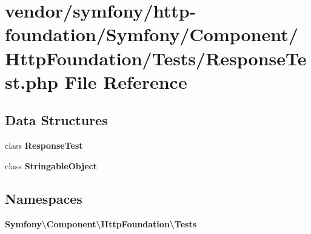 \section{vendor/symfony/http-\/foundation/\+Symfony/\+Component/\+Http\+Foundation/\+Tests/\+Response\+Test.php File Reference}
\label{_response_test_8php}
\subsection*{Data Structures}
\begin{DoxyCompactItemize}
\item 
class {\bf Response\+Test}
\item 
class {\bf Stringable\+Object}
\end{DoxyCompactItemize}
\subsection*{Namespaces}
\begin{DoxyCompactItemize}
\item 
 {\bf Symfony\textbackslash{}\+Component\textbackslash{}\+Http\+Foundation\textbackslash{}\+Tests}
\end{DoxyCompactItemize}

